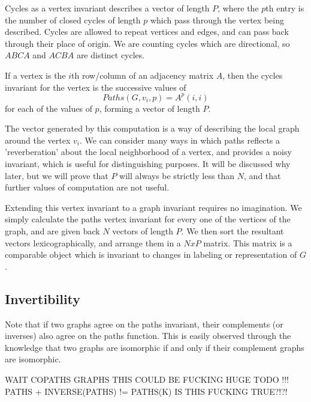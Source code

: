 \documentclass[11pt,a4paper]{report}
\begin{document}
Cycles as a vertex invariant describes a vector of length $P$, where the $p$th entry is the number of closed cycles of length $p$ which pass through the vertex being described.
Cycles are allowed to repeat vertices and edges, and can pass back through their place of origin.
We are counting cycles which are directional, so $ABCA$ and $ACBA$ are distinct cycles. 

If a vertex is the $i$th row/column of an adjacency matrix $A$, then the cycles invariant for the vertex is the successive values of $$Paths(G, v_i, p) = A^p(i,i)$$
for each of the values of $p$, forming a vector of length $P$.

The vector generated by this computation is a way of describing the local graph around the vertex $v_i$.
We can consider many ways in which paths reflects a 'reverberation' about the local neighborhood of a vertex, and provides a noisy invariant, which is useful for distinguishing purposes. 
It will be discussed why later, but we will prove that $P$ will always be strictly less than $N$, and that further values of computation are not useful.

Extending this vertex invariant to a graph invariant requires no imagination. 
We simply calculate the paths vertex invariant for every one of the vertices of the graph, and are given back $N$ vectors of length $P$.
We then sort the resultant vectors lexicographically, and arrange them in a $NxP$ matrix.
This matrix is a comparable object which is invariant to changes in labeling or representation of $G$.

\subsection{Invertibility}
Note that if two graphs agree on the paths invariant, their complements (or inverses) also agree on the paths function.
This is easily observed through the knowledge that two graphs are isomorphic if and only if their complement graphs are isomorphic.

WAIT COPATHS GRAPHS THIS COULD BE FUCKING HUGE
TODO !!! PATHS + INVERSE(PATHS) != PATHS(K)
IS THIS FUCKING TRUE?!?!
\end{document}

